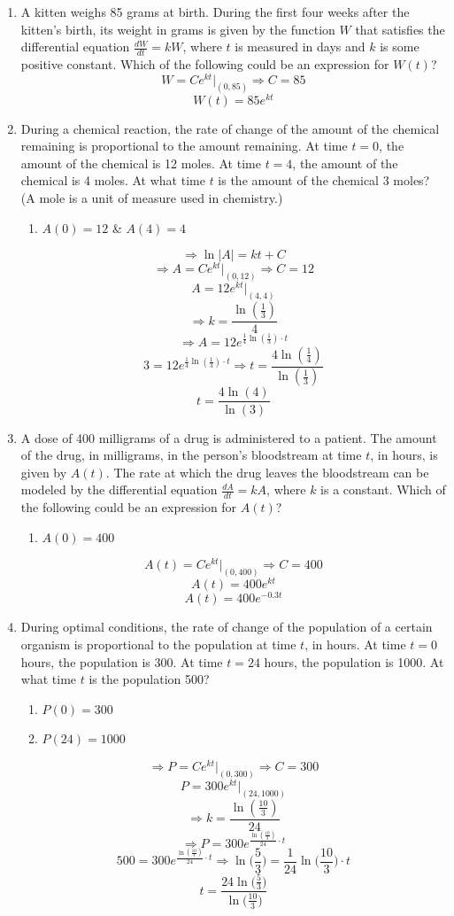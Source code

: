 \documentclass[12pt]{article}
\begin{document}
\begin{enumerate}
    \item A kitten weighs 85 grams at birth. During the first four weeks after the kitten’s birth, its weight in grams is given by the function $W$ that satisfies the differential equation $\frac{dW}{dt}=kW$, where $t$ is measured in days and $k$ is some positive constant. Which of the following could be an expression for $W(t)$?
    $$W=Ce^{kt}\biggr\rvert_{(0,85)} \Longrightarrow C=85$$ 
    $$\boxed{W(t)=85e^{kt}}$$
    \item During a chemical reaction, the rate of change of the amount of the chemical remaining is proportional to the amount remaining. At time $t=0$, the amount of the chemical is 12 moles. At time $t=4$, the amount of the chemical is 4 moles. At what time $t$ is the amount of the chemical 3 moles? (A mole is a unit of measure used in chemistry.)
    \begin{enumerate}
        \item $A(0)=12$ \& $A(4)=4$
    \end{enumerate}
$$\Longrightarrow \ln|A|=kt +C$$
$$\Longrightarrow A=Ce^{kt}\biggr\rvert_{(0, 12)} \Longrightarrow C=12$$
$$ A=12e^{kt} \biggr\rvert_{(4,4)}$$
$$\Longrightarrow k=\frac{\ln(\frac{1}{3})}{4}$$
$$\Longrightarrow A=12e^{\frac{1}{4} \ln(\frac{1}{3}) \cdot t}$$
$$3=12e^{\frac{1}{4} \ln(\frac{1}{3}) \cdot t} \Longrightarrow t=\frac{4\ln(\frac{1}{4})}{\ln(\frac{1}{3})}$$
$$\boxed{t=\frac{4\ln(4)}{\ln(3)}}$$

    
    \item  A dose of 400 milligrams of a drug is administered to a patient. The amount of the drug, in milligrams, in the person’s bloodstream at time $t$, in hours, is given by $A(t)$. The rate at which the drug leaves the bloodstream can be modeled by the differential equation $\frac{dA}{dt}=kA$, where $k$ is a constant. Which of the following could be an expression for $A(t)$?
    \begin{enumerate}
        \item $A(0)=400$
    \end{enumerate}
    $$A(t)=Ce^{kt} \biggr\rvert_{(0,400)} \Longrightarrow C=400$$
    $$A(t)=400e^{kt}$$
    $$\boxed{A(t)=400e^{-0.3t}}$$
    \item During optimal conditions, the rate of change of the population of a certain organism is proportional to the population at time $t$, in hours. At time $t=0$ hours, the population is 300. At time $t=24$ hours, the population is 1000. At what time $t$ is the population 500?
    \begin{enumerate}
        \item $P(0)=300$
        \item $P(24)=1000$
    \end{enumerate}
$$\Longrightarrow P=Ce^{kt}\biggr\rvert_{(0, 300)} \Longrightarrow C=300$$
$$ P=300e^{kt} \biggr\rvert_{(24,1000)}$$
$$\Longrightarrow k=\frac{\ln(\frac{10}{3})}{24}$$
$$\Longrightarrow P=300e^{\frac{\ln(\frac{10}{3})}{24} \cdot t}$$
$$500=300e^{\frac{\ln(\frac{10}{3})}{24} \cdot t} \Longrightarrow \ln \biggr(\frac{5}{3}\biggr) = \frac{1}{24}\ln\biggr(\frac{10}{3}\biggr) \cdot t$$
$$\boxed{t=\frac{24\ln \biggr(\frac{5}{3}\biggr)}{\ln\biggr(\frac{10}{3}\biggr)}}$$
    

\end{enumerate}
\end{document}
